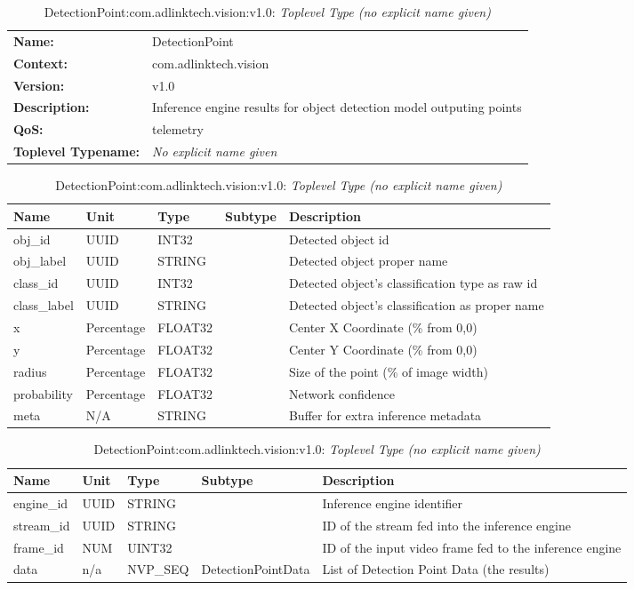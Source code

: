 \begin{table}[H]
\begin{tabularx}{\textwidth}{l X} 
       \textbf{Name:} & DetectionPoint \\ 
	   \textbf{Context:} & com.adlinktech.vision \\ 
	   \textbf{Version:} & v1.0 \\ 
	   \textbf{Description:} & Inference engine results for object detection model outputing points \\ 
	   \textbf{QoS:} & telemetry \\
	   \textbf{Toplevel Typename:} & \textit{No explicit name given} \\ 
\end{tabularx}
\caption{DetectionPoint:com.adlinktech.vision:v1.0}\label{DetectionPointTagGroup.json:table:DetectionPoint}
\bigskip
\begin{tabularx}{\textwidth}{l l l l X} 
	 \textbf{Name} & \textbf{Unit} & \textbf{Type} & \textbf{Subtype} & \textbf{Description} \\
	 \midrule
   obj\_id & UUID & INT32 &  & Detected object id \\
   obj\_label & UUID & STRING &  & Detected object proper name \\
   class\_id & UUID & INT32 &  & Detected object's classification type as raw id \\
   class\_label & UUID & STRING &  & Detected object's classification as proper name \\
   x & Percentage & FLOAT32 &  & Center X Coordinate (\% from 0,0) \\
   y & Percentage & FLOAT32 &  & Center Y Coordinate (\% from 0,0) \\
   radius & Percentage & FLOAT32 &  & Size of the point (\% of image width) \\
   probability & Percentage & FLOAT32 &  & Network confidence \\
   meta & N/A & STRING &  & Buffer for extra inference metadata \\
\end{tabularx}
\caption{DetectionPoint:com.adlinktech.vision:v1.0: DetectionPointData}\label{DetectionPointTagGroup.json:table:DetectionPoint-DetectionPointData}

\bigskip
\begin{tabularx}{\textwidth}{l l l l X} 
	 \textbf{Name} & \textbf{Unit} & \textbf{Type} & \textbf{Subtype} & \textbf{Description} \\
	 \midrule
   engine\_id & UUID & STRING &  & Inference engine identifier \\
   stream\_id & UUID & STRING &  & ID of the stream fed into the inference engine \\
   frame\_id & NUM & UINT32 &  & ID of the input video frame fed to the inference engine \\
   data & n/a & NVP\_SEQ & DetectionPointData & List of Detection Point Data (the results) \\
\end{tabularx}
\caption{DetectionPoint:com.adlinktech.vision:v1.0: \textit{Toplevel Type (no explicit name given)}}\label{DetectionPointTagGroup.json:table:DetectionPoint-no-type-given}



\end{table}
